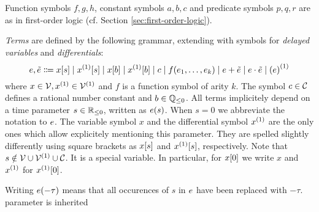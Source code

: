     Function symbols $f,g,h$, constant symbols $a,b,c$ and predicate symbols $p,q,r$ are as in first-order logic (cf. Section \ref{sec:first-order-logic}).


    \begin{definition}[Terms]\label{def:syntax-terms}
        \emph{Terms} are defined by the following grammar, extending \dL with symbols for \emph{delayed variables} and \emph{differentials}:
        \begin{equation*}
            \astrm,\bstrm \Coloneqq
                \xtau[s] \mid
                \Dxtau[s] \mid
                \xtau[b] \mid
                \Dxtau[b] \mid
                c \mid
                f(\range{\istrm{1}}{\istrm{k}}) \mid
                \astrm + \bstrm \mid
                \astrm \cdot \bstrm \mid
                \D{(\astrm)}
        \end{equation*}
        where $x\in\allvars,\D{x}\in\diffvars$ and $f$ is a function symbol of arity $k$.
        The symbol $c\in\mathcal{C}_{}$ defines a rational number constant and $b\in\mathbb{Q}_{\leq 0}$.
        All terms implicitely depend on a time parameter $s\in\mathbb{R}_{\leq 0}$, written as $e(s)$. When $s=0$ we abbreviate the notation to $e$.
        The variable symbol $x$ and the differential symbol $\D{x}$ are the only ones which allow explicitely mentioning this parameter. They are spelled slightly differently using square brackets as $x[s]$ and $\Dxtau[s]$, respectively. Note that $s\notin\allvars\cup\diffvars\cup\constants$. It is a special variable.
        In particular, for $x[0]$ we write $x$ and $\D{x}$ for $\Dxtau[0]$.

        Writing $e(-\tau)$ means that all occurences of $s$ in $e$ have been replaced with $-\tau$.
        parameter is inherited


    \end{definition}

